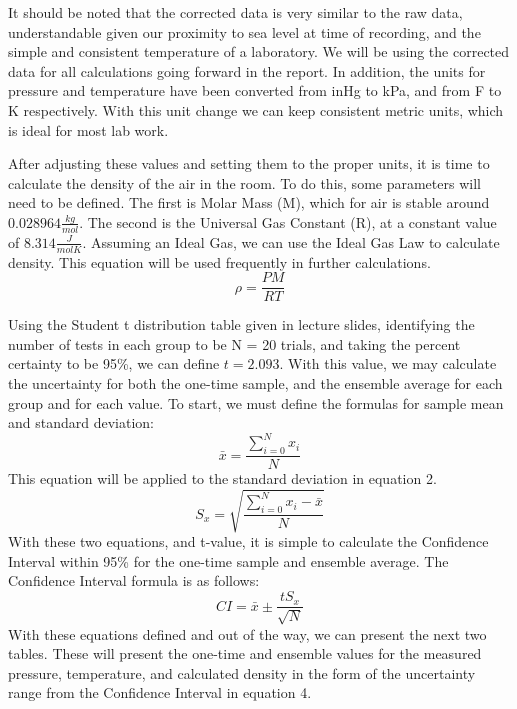 \documentclass[conf]{new-aiaa}
\begin{document}
It should be noted that the corrected data is very similar to the raw data, understandable given our proximity to sea level at time of recording, and the simple and consistent temperature of a laboratory. We will be using the corrected data for all calculations going forward in the report. In addition, the units for pressure and temperature have been converted from inHg to kPa, and from F to K respectively. With this unit change we can keep consistent metric units, which is ideal for most lab work.
\par
After adjusting these values and setting them to the proper units, it is time to calculate the density of the air in the room. To do this, some parameters will need to be defined. The first is Molar Mass (M), which for air is stable around $0.028964 \frac{kg}{mol}$. The second is the Universal Gas Constant (R), at a constant value of $8.314 \frac{J}{mol K}$. Assuming an Ideal Gas, we can use the Ideal Gas Law to calculate density. This equation will be used frequently in further calculations.
\begin{equation}
    \rho = \frac{PM}{RT}
\end{equation}
\par
Using the Student t distribution table given in lecture slides, identifying the number of tests in each group to be N = 20 trials, and taking the percent certainty to be 95\%, we can define $t = 2.093$. With this value, we may calculate the uncertainty for both the one-time sample, and the ensemble average for each group and for each value. To start, we must define the formulas for sample mean and standard deviation:
\begin{equation}
    \bar{x} = \frac{\sum_{i=0}^Nx_i}{N}
\end{equation}
This equation will be applied to the standard deviation in equation 2.
\begin{equation}
    S_x = \sqrt{\frac{\sum_{i=0}^Nx_i-\bar{x}}{N}}
\end{equation}
With these two equations, and t-value, it is simple to calculate the Confidence Interval within 95\% for the one-time sample and ensemble average. The Confidence Interval formula is as follows:
\begin{equation}
    CI = \bar{x} \pm \frac{tS_x}{\sqrt{N}}
\end{equation}
With these equations defined and out of the way, we can present the next two tables. These will present the one-time and ensemble values for the measured pressure, temperature, and calculated density in the form of the uncertainty range from the Confidence Interval in equation 4.
\end{document}
